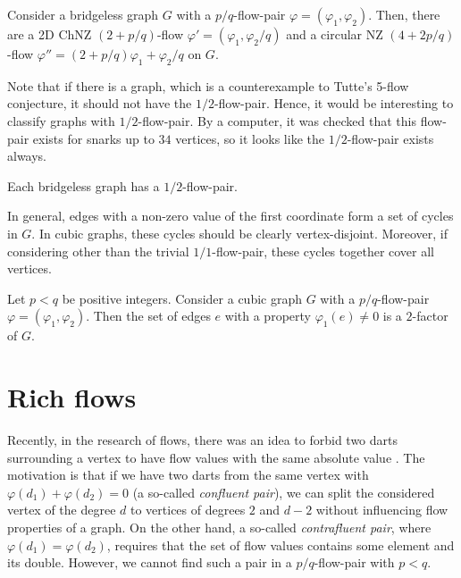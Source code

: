 \begin{proposition} \emph{\cite[pp. 19, 20]{preprint}}
Consider a bridgeless graph $G$ with a $p/q$-flow-pair $\varphi=(\varphi_1, \varphi_2)$. Then, there are a 2D ChNZ $(2+p/q)$-flow $\varphi'=(\varphi_1, \varphi_2/q)$ and a circular NZ $(4+2p/q)$-flow $\varphi''=(2+p/q)\varphi_1+\varphi_2/q$ on $G$.\label{prop:nzf_from_flow_pair}
\end{proposition}

Note that if there is a graph, which is a counterexample to Tutte's 5-flow conjecture, it should not have the $1/2$-flow-pair. Hence, it would be interesting to classify graphs with $1/2$-flow-pair. By a computer, it was checked that this flow-pair exists for snarks up to $34$ vertices, so it looks like the $1/2$-flow-pair exists always.

\begin{conjecture} \emph{\cite[p. 22]{preprint}}
Each bridgeless graph has a $1/2$-flow-pair.
\end{conjecture}

In general, edges with a non-zero value of the first coordinate form a set of cycles in $G$. In cubic graphs, these cycles should be clearly vertex-disjoint. Moreover, if considering other than the trivial $1/1$-flow-pair, these cycles together cover all vertices.

\begin{lemma} \emph{\cite[p. 21]{preprint}}
Let $p<q$ be positive integers. Consider a cubic graph $G$ with a $p/q$-flow-pair $\varphi=(\varphi_1, \varphi_2)$. Then the set of edges $e$ with a property $\varphi_1(e)\neq 0$ is a $2$-factor of $G$.\label{lem:flow_pair_2_factor}
\end{lemma}

\section{Rich flows}

Recently, in the research of flows, there was an idea to forbid two darts surrounding a vertex to have flow values with the same absolute value \cite{rich_flows, rich_flows_not_cubic}. The motivation is that if we have two darts from the same vertex with $\varphi\left(d_1\right)+\varphi\left(d_2\right)=0$ (a so-called \emph{confluent pair}), we can split the considered vertex of the degree $d$ to vertices of degrees $2$ and $d-2$ without influencing flow properties of a graph. On the other hand, a so-called \emph{contrafluent pair}, where $\varphi\left(d_1\right)=\varphi\left(d_2\right)$, requires that the set of flow values contains some element and its double. However, we cannot find such a pair in a $p/q$-flow-pair with $p<q$.

